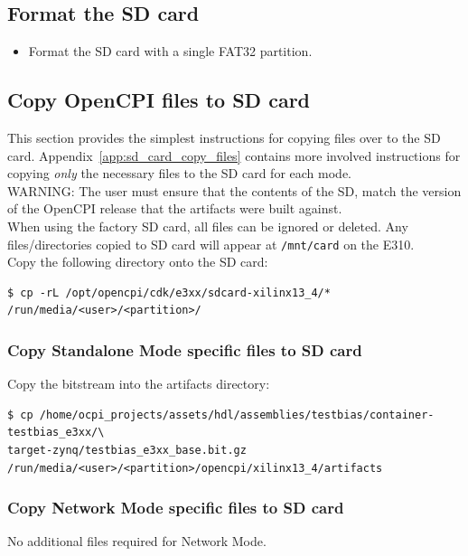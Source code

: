 \subsection{Format the SD card}
\begin{itemize}
\item Format the SD card with a single FAT32 partition.
\end{itemize}

\subsection{Copy OpenCPI files to SD card}
This section provides the simplest instructions for copying files over to the SD card. Appendix~\ref{app:sd_card_copy_files} contains more involved instructions for copying \textit{only} the necessary files to the SD card for each mode.\\

\noindent WARNING: The user must ensure that the contents of the SD, match the version of the OpenCPI release that the artifacts were built against.\\

\noindent When using the factory SD card, all files can be ignored or deleted. Any files/directories copied to SD card will appear at \texttt{/mnt/card} on the E310.\\

\noindent Copy the following directory onto the SD card:
\begin{verbatim}
$ cp -rL /opt/opencpi/cdk/e3xx/sdcard-xilinx13_4/* /run/media/<user>/<partition>/
\end{verbatim}

\subsubsection{Copy Standalone Mode specific files to SD card}
Copy the  bitstream into the artifacts directory:
\begin{verbatim}
$ cp /home/ocpi_projects/assets/hdl/assemblies/testbias/container-testbias_e3xx/\
target-zynq/testbias_e3xx_base.bit.gz /run/media/<user>/<partition>/opencpi/xilinx13_4/artifacts
\end{verbatim}

\subsubsection{Copy Network Mode specific files to SD card}
No additional files required for Network Mode.

